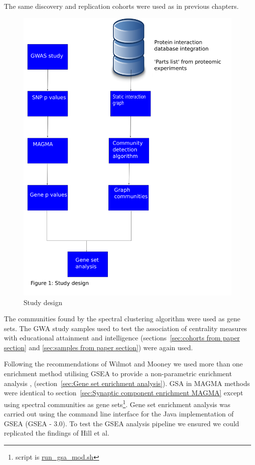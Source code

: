 The same discovery and replication cohorts were used as in previous chapters. 

\begin{figure}
    \centering
    \includegraphics[width=\textwidth]{images/study_design.png}
    \caption{Study design}
    \label{fig:study design community detection}
\end{figure}



The communities found by the spectral clustering algorithm were used as gene sets. The GWA study samples used to test the association of centrality measures with educational attainment and intelligence (sections~\ref{sec:cohorts from paper section} and \ref{sec:samples from paper section}) were again used.

Following the recommendations of Wilmot and Mooney we used more than one enrichment method utilising GSEA to provide a non-parametric enrichment analysis \cite{subramanian2005gene},\cite{mooney2015gene} (section~\ref{sec:Gene set enrichment analysis}).  GSA in MAGMA methods were identical to section~\ref{sec:Synaptic component enrichment MAGMA} except using spectral communities as gene sets\footnote{script is \url{run_gsa_mod.sh}}.    Gene set enrichment analysis was carried out using the command line interface for the Java implementation of GSEA (GSEA - 3.0). To test the GSEA analysis pipeline we ensured we could replicated the findings of Hill et al\cite{hill2014functional}.  

